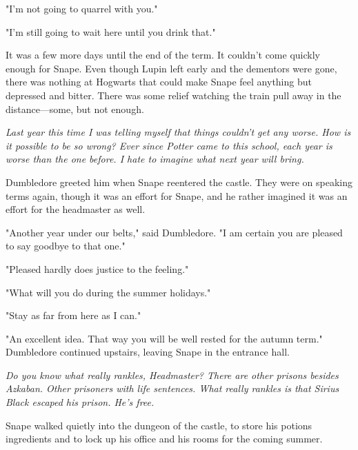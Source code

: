 "I'm not going to quarrel with you."

"I'm still going to wait here until you drink that."

\sbreak

It was a few more days until the end of the term. It couldn't come quickly enough for Snape. Even though Lupin left early and the dementors were gone, there was nothing at Hogwarts that could make Snape feel anything but depressed and bitter. There was some relief watching the train pull away in the distance—some, but not enough.

\emph{Last year this time I was telling myself that things couldn't get any worse. How is it possible to be so wrong? Ever since Potter came to this school, each year is worse than the one before. I hate to imagine what next year will bring.}

Dumbledore greeted him when Snape reentered the castle. They were on speaking terms again, though it was an effort for Snape, and he rather imagined it was an effort for the headmaster as well.

"Another year under our belts," said Dumbledore. "I am certain you are pleased to say goodbye to that one."

"Pleased hardly does justice to the feeling."

"What will you do during the summer holidays."

"Stay as far from here as I can."

"An excellent idea. That way you will be well rested for the autumn term." Dumbledore continued upstairs, leaving Snape in the entrance hall.

\emph{Do you know what really rankles, Headmaster? There are other prisons besides Azkaban. Other prisoners with life sentences. What really rankles is that Sirius Black escaped his prison. He's free.}

Snape walked quietly into the dungeon of the castle, to store his potions ingredients and to lock up his office and his rooms for the coming summer.


